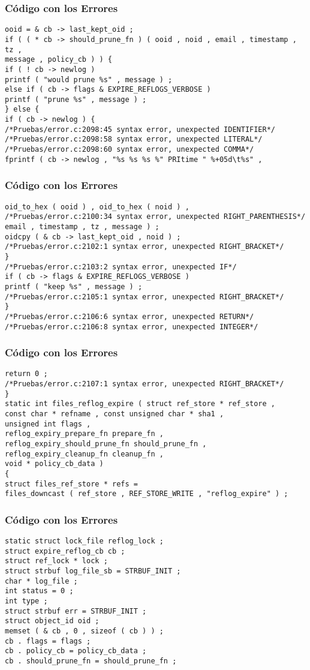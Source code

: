\documentclass{beamer}
\begin{document}
\begin{frame}[fragile]
\frametitle{C\'odigo con los Errores}
\begin{verbatim}
ooid = & cb -> last_kept_oid ; 
if ( ( * cb -> should_prune_fn ) ( ooid , noid , email , timestamp , tz , 
message , policy_cb ) ) { 
if ( ! cb -> newlog ) 
printf ( "would prune %s" , message ) ; 
else if ( cb -> flags & EXPIRE_REFLOGS_VERBOSE ) 
printf ( "prune %s" , message ) ; 
} else { 
if ( cb -> newlog ) { 
/*Pruebas/error.c:2098:45 syntax error, unexpected IDENTIFIER*/
/*Pruebas/error.c:2098:58 syntax error, unexpected LITERAL*/
/*Pruebas/error.c:2098:60 syntax error, unexpected COMMA*/
fprintf ( cb -> newlog , "%s %s %s %" PRItime " %+05d\t%s" , 
\end{verbatim}
\end{frame}
\begin{frame}[fragile]
\frametitle{C\'odigo con los Errores}
\begin{verbatim}
oid_to_hex ( ooid ) , oid_to_hex ( noid ) , 
/*Pruebas/error.c:2100:34 syntax error, unexpected RIGHT_PARENTHESIS*/
email , timestamp , tz , message ) ; 
oidcpy ( & cb -> last_kept_oid , noid ) ; 
/*Pruebas/error.c:2102:1 syntax error, unexpected RIGHT_BRACKET*/
} 
/*Pruebas/error.c:2103:2 syntax error, unexpected IF*/
if ( cb -> flags & EXPIRE_REFLOGS_VERBOSE ) 
printf ( "keep %s" , message ) ; 
/*Pruebas/error.c:2105:1 syntax error, unexpected RIGHT_BRACKET*/
} 
/*Pruebas/error.c:2106:6 syntax error, unexpected RETURN*/
/*Pruebas/error.c:2106:8 syntax error, unexpected INTEGER*/
\end{verbatim}
\end{frame}
\begin{frame}[fragile]
\frametitle{C\'odigo con los Errores}
\begin{verbatim}
return 0 ; 
/*Pruebas/error.c:2107:1 syntax error, unexpected RIGHT_BRACKET*/
} 
static int files_reflog_expire ( struct ref_store * ref_store , 
const char * refname , const unsigned char * sha1 , 
unsigned int flags , 
reflog_expiry_prepare_fn prepare_fn , 
reflog_expiry_should_prune_fn should_prune_fn , 
reflog_expiry_cleanup_fn cleanup_fn , 
void * policy_cb_data ) 
{ 
struct files_ref_store * refs = 
files_downcast ( ref_store , REF_STORE_WRITE , "reflog_expire" ) ; 
\end{verbatim}
\end{frame}
\begin{frame}[fragile]
\frametitle{C\'odigo con los Errores}
\begin{verbatim}
static struct lock_file reflog_lock ; 
struct expire_reflog_cb cb ; 
struct ref_lock * lock ; 
struct strbuf log_file_sb = STRBUF_INIT ; 
char * log_file ; 
int status = 0 ; 
int type ; 
struct strbuf err = STRBUF_INIT ; 
struct object_id oid ; 
memset ( & cb , 0 , sizeof ( cb ) ) ; 
cb . flags = flags ; 
cb . policy_cb = policy_cb_data ; 
cb . should_prune_fn = should_prune_fn ; 
\end{verbatim}
\end{frame}
\end{document}
